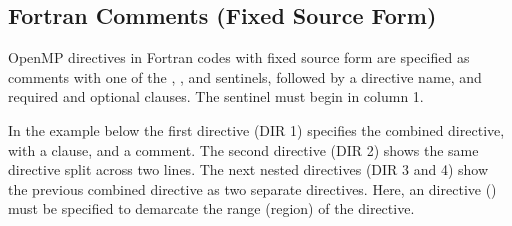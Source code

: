 \pagebreak
\begin{fortranspecific}[4ex]
\section{Fortran Comments (Fixed Source Form)}
\label{sec:fortran_fixed_format_comments}

OpenMP directives in Fortran codes with fixed source form are specified as comments with one of the
, , and  sentinels, followed by a
directive name, and required and optional clauses.  The sentinel must begin in column 1.

In the example below the first directive (DIR 1) specifies the %
 combined directive, with a  clause, and a comment.
The second directive (DIR 2) shows the same directive split
across two lines. The next nested directives (DIR 3 and 4) show the previous combined directive as
two separate directives. 
Here, an  directive () must be specified to demarcate the range (region)
of the  directive.

\end{fortranspecific}
\clearpage
